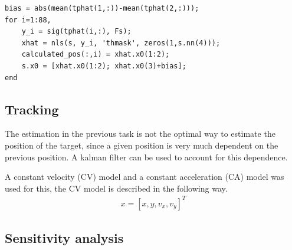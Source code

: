 \documentclass[11pt]{article}
\begin{document}
\begin{verbatim}
bias = abs(mean(tphat(1,:))-mean(tphat(2,:)));
for i=1:88,
    y_i = sig(tphat(i,:), Fs);
    xhat = nls(s, y_i, 'thmask', zeros(1,s.nn(4)));
    calculated_pos(:,i) = xhat.x0(1:2);
    s.x0 = [xhat.x0(1:2); xhat.x0(3)+bias];
end
\end{verbatim}


\subsection{Tracking}
The estimation in the previous task is not the optimal way to estimate the position of the target, since a given position is very much dependent on the previous position. A kalman filter can be used to account for this dependence.

A constant velocity (CV) model and a constant acceleration (CA) model was used for this, the CV model is described in the following way.
\begin{align*}
x = [x, y, v_x, v_y]^T
\end{align*}


\subsection{Sensitivity analysis}
\end{document}
